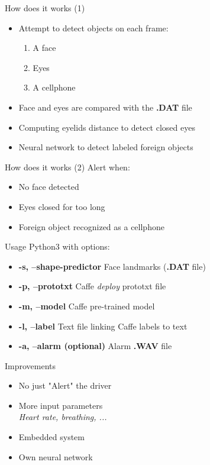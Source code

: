 \documentclass{beamer}
\begin{document}
\begin{frame}{How does it works (1)}
    \begin{itemize}
        \item Attempt to detect objects on each frame:
            \begin{enumerate}
                \item A face
                \item Eyes
                \item A cellphone
            \end{enumerate}
        \item Face and eyes are compared with the \textbf{.DAT} file
        \item Computing eyelids distance to detect closed eyes
        \item Neural network to detect labeled foreign objects
    \end{itemize}
\end{frame}

\begin{frame}{How does it works (2)}
         Alert when:
            \begin{itemize}
                \item No face detected
                \item Eyes closed for too long
                \item Foreign object recognized as a cellphone
            \end{itemize}
\end{frame}

\begin{frame}{Usage}
    Python3 with options:
    \begin{itemize}
        \item \textbf{-s, --shape-predictor} Face landmarks (\textbf{.DAT} file)
        \item \textbf{-p, --prototxt} Caffe \textit{deploy} prototxt file
        \item \textbf{-m, --model} Caffe pre-trained model
        \item \textbf{-l, --label} Text file linking Caffe labels to text
        \item \textbf{-a, --alarm (optional)} Alarm \textbf{.WAV} file
    \end{itemize}
\end{frame}

\begin{frame}{Improvements}
    \begin{itemize}
        \item No just "Alert" the driver
        \item More input parameters \\
            \hspace{0.27cm} \textit{Heart rate, breathing, ...}
        \item Embedded system
        \item Own neural network
    \end{itemize}
\end{frame}
\end{document}
